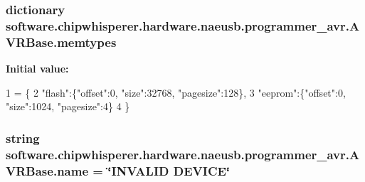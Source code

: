 \subsubsection[{memtypes}]{\setlength{\rightskip}{0pt plus 5cm}dictionary software.\+chipwhisperer.\+hardware.\+naeusb.\+programmer\+\_\+avr.\+A\+V\+R\+Base.\+memtypes\hspace{0.3cm}{\ttfamily [static]}}\label{classsoftware_1_1chipwhisperer_1_1hardware_1_1naeusb_1_1programmer__avr_1_1AVRBase_a065728e535a001c7fbd3bf3215a16806}
{\bfseries Initial value\+:}
\begin{DoxyCode}
1 = \{
2        \textcolor{stringliteral}{"flash"}:\{\textcolor{stringliteral}{"offset"}:0, \textcolor{stringliteral}{"size"}:32768, \textcolor{stringliteral}{"pagesize"}:128\},
3        \textcolor{stringliteral}{"eeprom"}:\{\textcolor{stringliteral}{"offset"}:0, \textcolor{stringliteral}{"size"}:1024, \textcolor{stringliteral}{"pagesize"}:4\}
4      \}
\end{DoxyCode}
\hypertarget{classsoftware_1_1chipwhisperer_1_1hardware_1_1naeusb_1_1programmer__avr_1_1AVRBase_af15f7f658b5661c34c1e32514db127b2}{}
\subsubsection[{name}]{\setlength{\rightskip}{0pt plus 5cm}string software.\+chipwhisperer.\+hardware.\+naeusb.\+programmer\+\_\+avr.\+A\+V\+R\+Base.\+name = \char`\"{}I\+N\+V\+A\+L\+I\+D D\+E\+V\+I\+C\+E\char`\"{}\hspace{0.3cm}{\ttfamily [static]}}\label{classsoftware_1_1chipwhisperer_1_1hardware_1_1naeusb_1_1programmer__avr_1_1AVRBase_af15f7f658b5661c34c1e32514db127b2}
\hypertarget{classsoftware_1_1chipwhisperer_1_1hardware_1_1naeusb_1_1programmer__avr_1_1AVRBase_a55a6e872347668de0f7b20cd833d8bcc}{}
